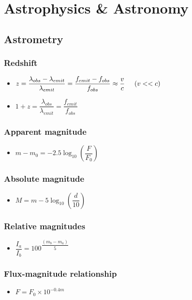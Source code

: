 \documentclass[]{report}
\newcommand \tab[1][1cm]{\hspace*{#1}}
\newcommand{\itemt}{\item \tab}
\begin{document}
\chapter{Astrophysics \& Astronomy}

	\section{Astrometry}



\subsection{Redshift}
\begin{itemize}
\itemt \( z = \dfrac{\lambda_{obs} - \lambda_{emit}}{\lambda_{emit}} =\dfrac{f_{emit} - f_{obs}}{f_{obs}} \approx \dfrac{v}{c}\tab[0.5cm] (v<<c) \)
\itemt \( 1+z = \dfrac{\lambda_{obs}}{\lambda_{emit}} = \dfrac{f_{emit}}{f_{obs}} \)
\end{itemize}

\subsection{Apparent magnitude}	
\begin{itemize}
\itemt \( m-m_0=-2.5\log_{10} (\dfrac{F}{F_0}) \)
\end{itemize}

\subsection{Absolute magnitude}
\begin{itemize}
\itemt \( M = m - 5 \log_{10} (\dfrac{d}{10}) \)
\end{itemize}

\subsection{Relative magnitudes}
\begin{itemize}
\itemt \( \dfrac{I_a}{I_b} = 100^{\dfrac{(m_b-m_a)}{5}} \)
\end{itemize}

\subsection{Flux-magnitude relationship}
\begin{itemize}
\itemt \( F = F_0\times 10^{-0.4m} \)
\end{itemize}			
\end{document}
